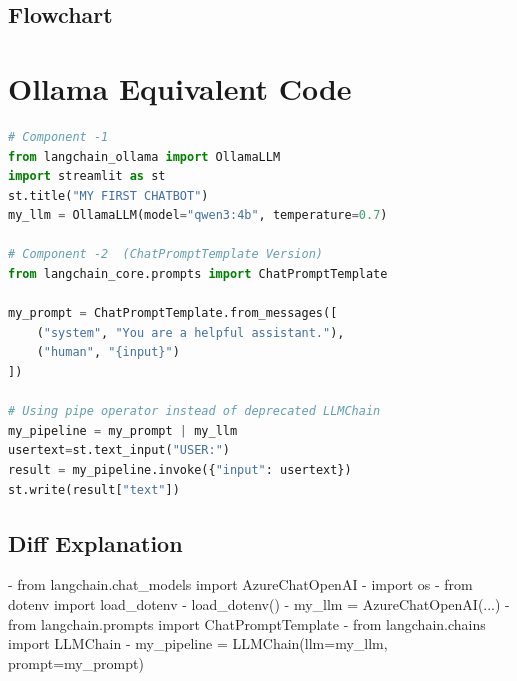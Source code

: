\documentclass[11pt, a4paper]{article}
\begin{document}
\subsection{Flowchart}

\section{Ollama Equivalent Code}
\begin{lstlisting}[language=Python]
# Component -1
from langchain_ollama import OllamaLLM
import streamlit as st
st.title("MY FIRST CHATBOT")
my_llm = OllamaLLM(model="qwen3:4b", temperature=0.7)

# Component -2  (ChatPromptTemplate Version)
from langchain_core.prompts import ChatPromptTemplate

my_prompt = ChatPromptTemplate.from_messages([
    ("system", "You are a helpful assistant."),
    ("human", "{input}")
])

# Using pipe operator instead of deprecated LLMChain
my_pipeline = my_prompt | my_llm
usertext=st.text_input("USER:")
result = my_pipeline.invoke({"input": usertext})
st.write(result["text"])
\end{lstlisting}

\subsection{Diff Explanation}
\begin{removedcode}
\begin{diffverb}
- from langchain.chat_models import AzureChatOpenAI
- import os
- from dotenv import load_dotenv
- load_dotenv()
- my_llm = AzureChatOpenAI(...)
- from langchain.prompts import ChatPromptTemplate
- from langchain.chains import LLMChain
- my_pipeline = LLMChain(llm=my_llm, prompt=my_prompt)
\end{diffverb}
\end{removedcode}
\end{document}
